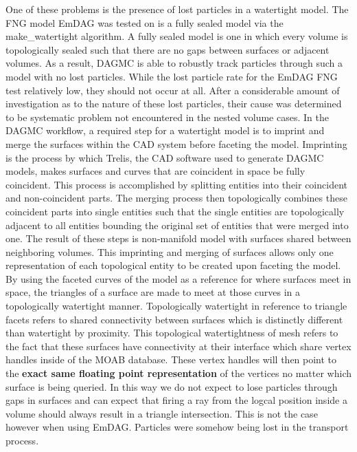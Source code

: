 \documentclass[12pt, a4paper]{article}
\begin{document}
One of these problems is the presence of lost particles in a watertight model. The FNG model EmDAG was tested on is a fully sealed model via the make\_watertight algorithm. A fully sealed model is one in which every volume is topologically sealed such that there are no gaps between surfaces or adjacent volumes. As a result, DAGMC is able to robustly track particles through such a model with no lost particles. While the lost particle rate for the EmDAG FNG test relatively low, they should not occur at all. After a considerable amount of investigation as to the nature of these lost particles, their cause was determined to be systematic problem not encountered in the nested volume cases. In the DAGMC workflow, a required step for a watertight model is to imprint and merge the surfaces within the CAD system before faceting the model. Imprinting is the process by which Trelis, the CAD software used to generate DAGMC models, makes surfaces and curves that are coincident in space be fully coincident. This process is accomplished by splitting entities into their coincident and non-coincident parts. The merging process then topologically combines these coincident parts into single entities such that the single entities are topologically adjacent to all entities bounding the original set of entities that were merged into one. The result of these steps is non-manifold model with surfaces shared between neighboring volumes. \cite{smith_thesis_2011} This imprinting and merging of surfaces allows only one representation of each topological entity to be created upon faceting the model. By using the faceted curves of the model as a reference for where surfaces meet in space, the triangles of a surface are made to meet at those curves in a topologically watertight manner. Topologically watertight in reference to triangle facets refers to shared connectivity between surfaces which is distinctly different than watertight by proximity. This topological watertightness of mesh refers to the fact that these surfaces have connectivity at their interface which share vertex handles inside of the MOAB database. These vertex handles will then point to the \textbf{exact same floating point representation} of the vertices no matter which surface is being queried. In this way we do not expect to lose particles through gaps in surfaces and can expect that firing a ray from the logcal position inside a volume should always result in a triangle intersection. This is not the case however when using EmDAG. Particles were somehow being lost in the transport process.
\end{document}
